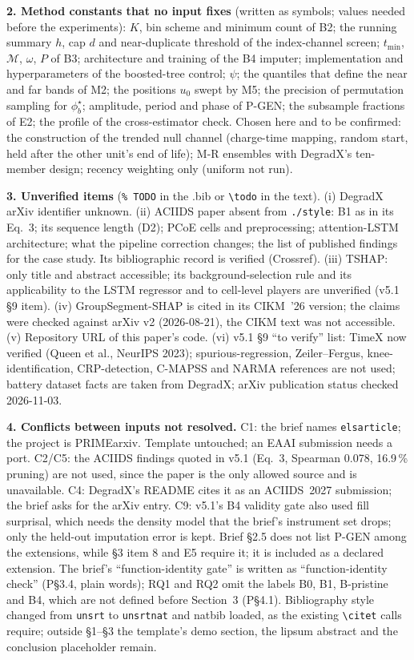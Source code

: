 \begin{reviewnotes}
\medskip\textbf{2. Method constants that no input fixes} (written as symbols; values needed before the experiments): $K$, bin scheme and minimum count of B2; the running summary $h$, cap $d$ and near-duplicate threshold of the index-channel screen; $t_{\min}$, $\mathcal{M}$, $\omega$, $P$ of B3; architecture and training of the B4 imputer; implementation and hyperparameters of the boosted-tree control; $\psi$; the quantiles that define the near and far bands of M2; the positions $u_0$ swept by M5; the precision of permutation sampling for $\phi^\star_b$; amplitude, period and phase of P-GEN; the subsample fractions of E2; the profile of the cross-estimator check. Chosen here and to be confirmed: the construction of the trended null channel (charge-time mapping, random start, held after the other unit's end of life); M-R ensembles with DegradX's ten-member design; recency weighting only (uniform not run).

\medskip\textbf{3. Unverified items} (\verb|% TODO| in the .bib or \verb|\todo| in the text).
(i) DegradX arXiv identifier unknown. (ii) ACIIDS paper absent from \texttt{./style}: B1 as in its Eq.~3; its sequence length (D2); PCoE cells and preprocessing; attention-LSTM architecture; what the pipeline correction changes; the list of published findings for the case study. Its bibliographic record is verified (Crossref). (iii) TSHAP: only title and abstract accessible; its background-selection rule and its applicability to the LSTM regressor and to cell-level players are unverified (v5.1 \S9 item). (iv) GroupSegment-SHAP is cited in its CIKM~'26 version; the claims were checked against arXiv v2 (2026-08-21), the CIKM text was not accessible. (v) Repository URL of this paper's code. (vi) v5.1 \S9 ``to verify'' list: TimeX now verified (Queen et al., NeurIPS 2023); spurious-regression, Zeiler--Fergus, knee-identification, CRP-detection, C-MAPSS and NARMA references are not used; battery dataset facts are taken from DegradX; arXiv publication status checked 2026-11-03.

\medskip\textbf{4. Conflicts between inputs not resolved.}
C1: the brief names \texttt{elsarticle}; the project is PRIMEarxiv. Template untouched; an EAAI submission needs a port.
C2/C5: the ACIIDS findings quoted in v5.1 (Eq.~3, Spearman 0.078, 16.9\,\% pruning) are not used, since the paper is the only allowed source and is unavailable.
C4: DegradX's README cites it as an ACIIDS~2027 submission; the brief asks for the arXiv entry.
C9: v5.1's B4 validity gate also used fill surprisal, which needs the density model that the brief's instrument set drops; only the held-out imputation error is kept.
Brief \S2.5 does not list P-GEN among the extensions, while \S3 item 8 and E5 require it; it is included as a declared extension.
The brief's ``function-identity gate'' is written as ``function-identity check'' (P\S3.4, plain words); RQ1 and RQ2 omit the labels B0, B1, B-pristine and B4, which are not defined before Section~3 (P\S4.1).
Bibliography style changed from \texttt{unsrt} to \texttt{unsrtnat} and natbib loaded, as the existing \verb|\citet| calls require; outside \S1--\S3 the template's demo section, the lipsum abstract and the conclusion placeholder remain.


\end{reviewnotes}
